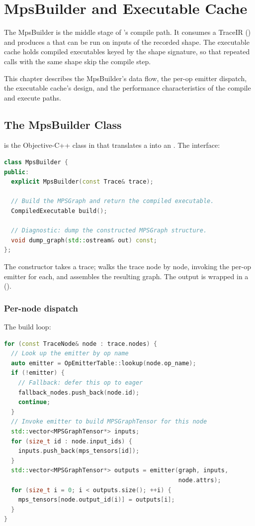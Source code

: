 \chapter{MpsBuilder and Executable Cache}
\label{ch:mps_builder}

The MpsBuilder is the middle stage of \Lucid's compile path. It
consumes a TraceIR () and produces a
 that can be run on inputs of the
recorded shape. The executable cache holds compiled executables
keyed by the shape signature, so that repeated calls with the
same shape skip the compile step.

This chapter describes the MpsBuilder's data flow, the per-op
emitter dispatch, the executable cache's design, and the
performance characteristics of the compile and execute paths.

\section{The MpsBuilder Class}
\label{sec:mps_builder:class}

 is the Objective-C++ class in
 that translates a
 into an . The interface:

\begin{lstlisting}[style=lucidcpp,language=C++]
class MpsBuilder {
public:
  explicit MpsBuilder(const Trace& trace);

  // Build the MPSGraph and return the compiled executable.
  CompiledExecutable build();

  // Diagnostic: dump the constructed MPSGraph structure.
  void dump_graph(std::ostream& out) const;
};
\end{lstlisting}

The constructor takes a trace;  walks the trace
node by node, invoking the per-op emitter for each, and assembles
the resulting  graph. The output is wrapped
in a 
().

\subsection{Per-node dispatch}
\label{ssec:mps_builder:per_node}

The build loop:

\begin{lstlisting}[style=lucidcpp,language=C++]
for (const TraceNode& node : trace.nodes) {
  // Look up the emitter by op name
  auto emitter = OpEmitterTable::lookup(node.op_name);
  if (!emitter) {
    // Fallback: defer this op to eager
    fallback_nodes.push_back(node.id);
    continue;
  }
  // Invoke emitter to build MPSGraphTensor for this node
  std::vector<MPSGraphTensor*> inputs;
  for (size_t id : node.input_ids) {
    inputs.push_back(mps_tensors[id]);
  }
  std::vector<MPSGraphTensor*> outputs = emitter(graph, inputs,
                                                 node.attrs);
  for (size_t i = 0; i < outputs.size(); ++i) {
    mps_tensors[node.output_id(i)] = outputs[i];
  }
}
\end{lstlisting}

